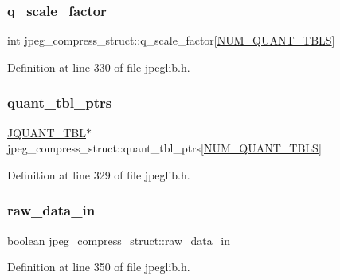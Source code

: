 \subsubsection{\texorpdfstring{q\_scale\_factor}{q\_scale\_factor}}
{\footnotesize\ttfamily int jpeg\+\_\+compress\+\_\+struct\+::q\+\_\+scale\+\_\+factor\mbox{[}\mbox{\hyperlink{jpeglib_8h_ab3254a23612ea48615001fffc0c9f691}{N\+U\+M\+\_\+\+Q\+U\+A\+N\+T\+\_\+\+T\+B\+LS}}\mbox{]}}



Definition at line 330 of file jpeglib.\+h.

\mbox{\label{structjpeg__compress__struct_a70a194c6a9c1744e1ed3a97232fb97f5}} 
\subsubsection{\texorpdfstring{quant\_tbl\_ptrs}{quant\_tbl\_ptrs}}
{\footnotesize\ttfamily \mbox{\hyperlink{structJQUANT__TBL}{J\+Q\+U\+A\+N\+T\+\_\+\+T\+BL}}$\ast$ jpeg\+\_\+compress\+\_\+struct\+::quant\+\_\+tbl\+\_\+ptrs\mbox{[}\mbox{\hyperlink{jpeglib_8h_ab3254a23612ea48615001fffc0c9f691}{N\+U\+M\+\_\+\+Q\+U\+A\+N\+T\+\_\+\+T\+B\+LS}}\mbox{]}}



Definition at line 329 of file jpeglib.\+h.

\mbox{\label{structjpeg__compress__struct_a7f9dfd37243943bc138815bcf1e89584}} 
\subsubsection{\texorpdfstring{raw\_data\_in}{raw\_data\_in}}
{\footnotesize\ttfamily \mbox{\hyperlink{jmorecfg_8h_a7c6368b321bd9acd0149b030bb8275ed}{boolean}} jpeg\+\_\+compress\+\_\+struct\+::raw\+\_\+data\+\_\+in}



Definition at line 350 of file jpeglib.\+h.

\mbox{\label{structjpeg__compress__struct_a9636f9df88d5a3ae56f0bb9a5f923db7}} 
